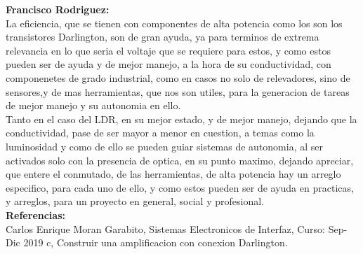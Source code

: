 \documentclass[12pt,a4paper]{article}
\begin{document}
\textbf{Francisco Rodriguez:}\\
La eficiencia, que se tienen con componentes de alta potencia como los son los transistores Darlington, son de gran ayuda, ya para terminos de extrema relevancia en lo que seria el voltaje que se requiere para estos, y como estos pueden ser de ayuda y de mejor manejo, a la hora de su conductividad, con componenetes de grado industrial, como en casos no solo de relevadores, sino de sensores,y de mas herramientas, que nos son utiles, para la generacion de tareas de mejor manejo y su autonomia en ello.\\
Tanto en el caso del LDR, en su mejor estado, y de mejor manejo, dejando que la conductividad, pase de ser mayor a menor en cuestion, a temas como la luminosidad y como de ello se pueden guiar sistemas de autonomia, al ser activados solo con la presencia de optica, en su punto maximo, dejando apreciar, que entere el conmutado, de las herramientas, de alta potencia hay un arreglo especifico, para cada uno de ello, y como estos pueden ser de ayuda en practicas, y arreglos, para un proyecto en general, social y profesional.\\

\textbf{\Large Referencias:}\\

Carlos Enrique Moran Garabito, Sistemas Electronicos de Interfaz, Curso: Sep-Dic 2019 c, Construir una amplificacion con conexion Darlington.
\end{document}
